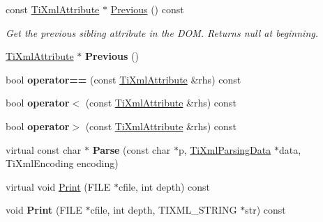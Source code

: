 \begin{DoxyCompactItemize}
\item 
\hypertarget{class_ti_xml_attribute_a54a5f8730c7b02b9a41b74e12e27fe86}{const \hyperlink{class_ti_xml_attribute}{Ti\+Xml\+Attribute} $\ast$ \hyperlink{class_ti_xml_attribute_a54a5f8730c7b02b9a41b74e12e27fe86}{Previous} () const }\label{class_ti_xml_attribute_a54a5f8730c7b02b9a41b74e12e27fe86}

\begin{DoxyCompactList}\small\item\em Get the previous sibling attribute in the D\+O\+M. Returns null at beginning. \end{DoxyCompactList}\item 
\hypertarget{class_ti_xml_attribute_ae4dabc932cba945ed1e92fec5f121193}{\hyperlink{class_ti_xml_attribute}{Ti\+Xml\+Attribute} $\ast$ {\bfseries Previous} ()}\label{class_ti_xml_attribute_ae4dabc932cba945ed1e92fec5f121193}

\item 
\hypertarget{class_ti_xml_attribute_ae48c2a65b520d453914ce4e845d607cf}{bool {\bfseries operator==} (const \hyperlink{class_ti_xml_attribute}{Ti\+Xml\+Attribute} \&rhs) const }\label{class_ti_xml_attribute_ae48c2a65b520d453914ce4e845d607cf}

\item 
\hypertarget{class_ti_xml_attribute_adb8b6f2cad5948e73e383182e7ce10de}{bool {\bfseries operator$<$} (const \hyperlink{class_ti_xml_attribute}{Ti\+Xml\+Attribute} \&rhs) const }\label{class_ti_xml_attribute_adb8b6f2cad5948e73e383182e7ce10de}

\item 
\hypertarget{class_ti_xml_attribute_a867562769ef9778c1690cd373246b05b}{bool {\bfseries operator$>$} (const \hyperlink{class_ti_xml_attribute}{Ti\+Xml\+Attribute} \&rhs) const }\label{class_ti_xml_attribute_a867562769ef9778c1690cd373246b05b}

\item 
\hypertarget{class_ti_xml_attribute_ad62774421b814894b995af3b5d231dda}{virtual const char $\ast$ {\bfseries Parse} (const char $\ast$p, \hyperlink{class_ti_xml_parsing_data}{Ti\+Xml\+Parsing\+Data} $\ast$data, Ti\+Xml\+Encoding encoding)}\label{class_ti_xml_attribute_ad62774421b814894b995af3b5d231dda}

\item 
virtual void \hyperlink{class_ti_xml_attribute_acc04956c1d5c4c31fe74f7a7528d109a}{Print} (F\+I\+L\+E $\ast$cfile, int depth) const 
\item 
\hypertarget{class_ti_xml_attribute_a19e6b6862a80b188571c47947e88d030}{void {\bfseries Print} (F\+I\+L\+E $\ast$cfile, int depth, T\+I\+X\+M\+L\+\_\+\+S\+T\+R\+I\+N\+G $\ast$str) const }\label{class_ti_xml_attribute_a19e6b6862a80b188571c47947e88d030}


\end{DoxyCompactItemize}
